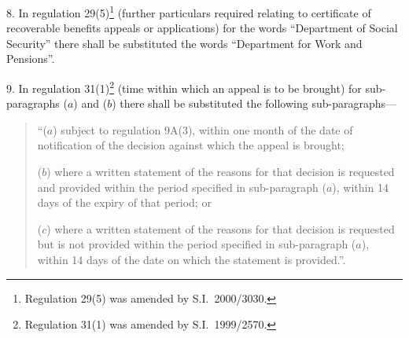 \documentclass[12pt,a4paper]{article}
\begin{document}
\medskip

8.  In regulation 29(5)\footnote{Regulation 29(5) was amended by S.I.\ 2000/3030.} (further particulars required relating to certificate of recoverable benefits appeals or applications) for the words “Department of Social Security” there shall be substituted the words “Department for Work and Pensions”.

\medskip

9.  In regulation 31(1)\footnote{Regulation 31(1) was amended by S.I.\ 1999/2570.} (time within which an appeal is to be brought) for sub-paragraphs ($a$)  and ($b$)  there shall be substituted the following sub-paragraphs—
\begin{quotation}
“($a$) subject to regulation 9A(3), within one month of the date of notification of the decision against which the appeal is brought;

($b$) where a written statement of the reasons for that decision is requested and provided within the period specified in sub-paragraph ($a$), within 14 days of the expiry of that period; or

($c$) where a written statement of the reasons for that decision is requested but is not provided within the period specified in sub-paragraph ($a$), within 14 days of the date on which the statement is provided.”.
\end{quotation}

\medskip
\end{document}
